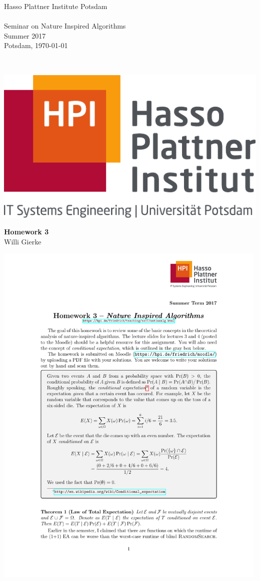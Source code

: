 \documentclass[12pt,a4paper]{article}
\begin{document}
\noindent
\begin{minipage}{0.66\textwidth}
Hasso Plattner Institute Potsdam\\
\\
Seminar on Nature Inspired Algorithms\\ Summer 2017\\
Potsdam, \today
\end{minipage}
~
\begin{minipage}{0.30\textwidth}
\includegraphics[width=\textwidth]{../homework_template/Hasso_Plattner_Institut_Logo}
\end{minipage}


\begin{center}
 {\LARGE \textbf{Homework 3}\\ \small Willi Gierke}
 \vspace*{0.5cm}
\end{center}


\includegraphics[clip, trim=0.5cm 2.5cm 0.5cm 4cm, width=0.99\textwidth, page=2]{homework03.pdf}
\clearpage
\end{document}
